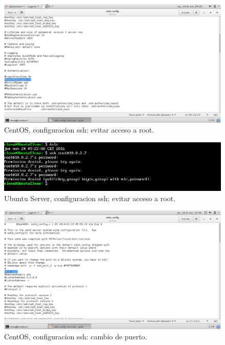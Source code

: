  
\begin{figure}[H] 
	\centering
	\includegraphics[width=15cm]{./img/ejercicio7-1.png} 	
	\caption{CentOS, configuracion ssh: evitar acceso a root.} \label{fig:ejercicio7-1}
\end{figure}

\begin{figure}[H] 
	\centering
	\includegraphics[width=15cm]{./img/ejercicio7-2.png} 	
	\caption{Ubuntu Server, configuracion ssh: evitar acceso a root.} \label{fig:ejercicio7-2}
\end{figure}

\begin{figure}[H] 
	\centering
	\includegraphics[width=15cm]{./img/ejercicio7-3.png} 	
	\caption{CentOS, configuracion ssh: cambio de puerto.} \label{fig:ejercicio7-3}
\end{figure}

